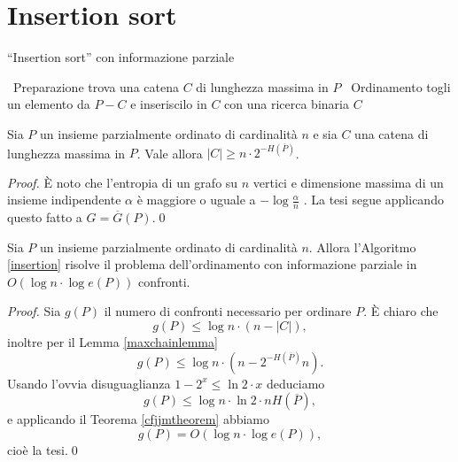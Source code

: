 \section{Insertion sort} 
\begin{algorithm}
	\caption{``Insertion sort'' con informazione parziale} \label{insertion} 
	\begin{algorithmic}
		[1] \STATE \, \COMMENT Preparazione \STATE trova una catena \(C\) di lunghezza massima in \(P\) \STATE \, \COMMENT Ordinamento  \STATE togli un elemento da \(P-C\) e inseriscilo in \(C\) con una ricerca binaria \ENDWHILE \RETURN \(C\) 
	\end{algorithmic}
\end{algorithm}
\begin{lemma}
	\label{maxchainlemma} Sia \(P\) un insieme parzialmente ordinato di cardinalità \(n\) e sia \(C\) una catena di lunghezza massima in \(P\). Vale allora \(\left|C\right|\ge n\cdot2^{-H(\overline{P})}\). 
\end{lemma}
\begin{proof}
	È noto che l'entropia di un grafo su \(n\) vertici e dimensione massima di un insieme indipendente \(\alpha\) è maggiore o uguale a \(-\log{\frac{\alpha}{n}}\) \cite{Cardinal2005}. La tesi segue applicando questo fatto a \(G=\overline{G}(P)\).\qed 
\end{proof}
\begin{theorem}
	Sia \(P\) un insieme parzialmente ordinato di cardinalità \(n\). Allora l'Algoritmo \ref{insertion} risolve il problema dell'ordinamento con informazione parziale in \(O(\log{n}\cdot\log{e(P)})\) confronti. 
\end{theorem}
\begin{proof}
	Sia \(g(P)\) il numero di confronti necessario per ordinare \(P\). È chiaro che
	\[g(P)\le \log{n}\cdot(n-|C|),\]
	inoltre per il Lemma \ref{maxchainlemma}
	\[g(P)\le\log{n}\cdot(n-2^{-H(\overline{P})}n).\]
	Usando l'ovvia disuguaglianza \(1-2^{x}\le\ln{2}\cdot x\) deduciamo
	\[g(P)\le\log{n}\cdot\ln{2}\cdot nH(\overline{P}),\]
	e applicando il Teorema \ref{cfjjmtheorem} abbiamo
	\[g(P)=O(\log{n}\cdot\log{e(P)}),\]
	cioè la tesi.\qed 
\end{proof}

